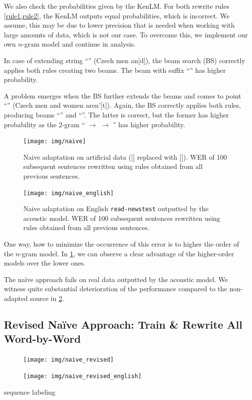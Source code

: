 We also check the probabilities given by the KenLM. For both rewrite rules \cref{rule1,rule2}, the KenLM outputs equal probabilities, which is incorrect. We assume, this may be due to lower precision that is needed when working with large amounts of data, which is not our case. To overcome this, we implement our own $n$-gram model and continue in analysis.

In case of extending string ``'' (Czech men an[d]), the beam search (BS) correctly applies both rules creating two beams. The beam with suffix ``'' has higher probability.

A problem emerges when the BS further extends the beams and comes to point ``'' (Czech men and women aren'[t]). Again, the BS correctly applies both rules, producing beams ``'' and ``''. The latter is correct, but the former has higher probability as the 2-gram `` $\rightarrow$   $\rightarrow$ '' has higher probability.

\begin{figure}[h]
	\texttt{[image: img/naive]}
	\caption{Naive adaptation on artificial data ([] replaced with []). WER of 100 subsequent sentences rewritten using rules obtained from all previous sentences.}
	\label{fig:naive} 
\end{figure}

\begin{figure}[h]
	\texttt{[image: img/naive\_english]}
	\caption{Naive adaptation on English \texttt{read-newstest} outputted by the acoustic model. WER of 100 subsequent sentences rewritten using rules obtained from all previous sentences.}
	\label{fig:naive_en} 
\end{figure}

One way, how to minimize the occurrence of this error is to higher the order of the $n$-gram model. In \cref{fig:naive}, we can observe a clear advantage of the higher-order models over the lower ones.

The na\"ive approach fails on real data outputted by the acoustic model. We witness quite substantial deterioration of the performance compared to the non-adapted source in \cref{fig:naive_en}.

\subsection[Revised Na\"ive Approach: Train \& Rewrite All Word-by-Word]{Revised Na\"ive Approach: Train \& Rewrite All \\Word-by-Word}


\begin{figure}[h]
	\texttt{[image: img/naive\_revised]}
	\caption{}
	\label{fig:naive_revised} 
\end{figure}

\begin{figure}[h]
	\texttt{[image: img/naive\_revised\_english]}
	\caption{}
	\label{fig:naive_revised_en} 
\end{figure}

sequence labeling

